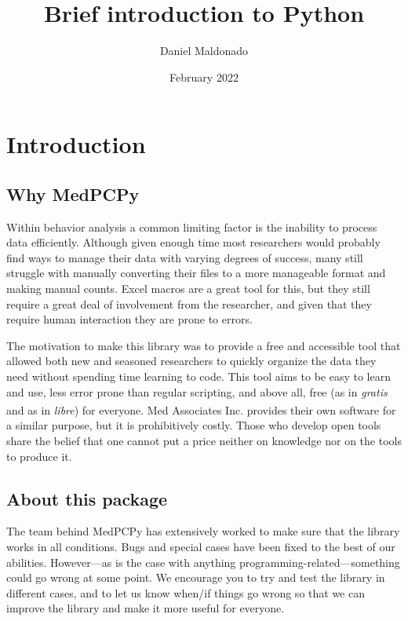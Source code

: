 \documentclass[a4paper,12pt]{article}
\title{Brief introduction to Python}
\author{Daniel Maldonado}
\date{February 2022}
\begin{document}
{\scshape\bfseries \maketitle}

\tableofcontents

\newpage
\section{Introduction}

\subsection{Why MedPCPy}

Within behavior analysis a common limiting factor is the inability to process data efficiently. Although given enough time most researchers would probably find ways to manage their data with varying degrees of success, many still struggle with manually converting their files to a more manageable format and making manual counts. Excel macros are a great tool for this, but they still require a great deal of involvement from the researcher, and given that they require human interaction they are prone to errors.

The motivation to make this library was to provide a free and accessible tool that allowed both new and seasoned researchers to quickly organize the data they need without spending time learning to code. This tool aims to be easy to learn and use, less error prone than regular scripting, and above all, free (as in {\slshape gratis} and as in {\slshape libre}) for everyone. Med Associates Inc.\textsuperscript{\textregistered} provides their own software for a similar purpose, but it is prohibitively costly. Those who develop open tools share the belief that one cannot put a price neither on knowledge nor on the tools to produce it.

\subsection{About this package}

The team behind MedPCPy has extensively worked to make sure that the library works in all conditions. Bugs and special cases have been fixed to the best of our abilities. However---as is the case with anything programming-related---something could go wrong at some point. We encourage you to try and test the library in different cases, and to let us know when/if things go wrong so that we can improve the library and make it more useful for everyone.
\end{document}

